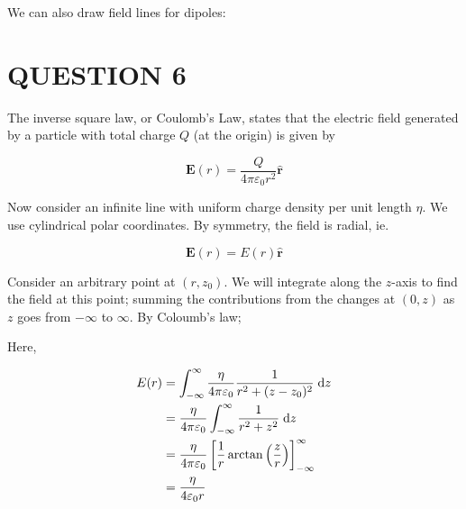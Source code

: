 \documentclass[a4paper]{article}
\begin{document}
We can also draw field lines for dipoles:
\begin{center}
\end{center}


\section{QUESTION 6}

The inverse square law, or Coulomb's Law, states that the electric field generated by a particle with total charge $ Q $ (at the origin) is given by

\[ \mathbf{E}(r) = \frac{Q}{4 \pi \varepsilon_{0} r^{2}} \hat{\mathbf{r}} \]

Now consider an infinite line with uniform charge density per unit length $ \eta $.
We use cylindrical polar coordinates. By symmetry, the field is radial, ie.

\[ \mathbf{E}(r) = E(r) \hat{\mathbf{r}} \]

Consider an arbitrary point at $ (r,z_{0}) $. We will integrate along the $ z $-axis to find the field at this point; summing the contributions from the changes at $ (0,z) $ as $ z $ goes from $ -\infty $ to $ \infty $. By Coloumb's law; 


%	

Here,

\begin{align*}
E(r) & = \int_{-\infty}^{\infty} \frac{\eta}{4 \pi \varepsilon_{0}} \frac{1}{r^{2} + (z-z_{0})^{2}} \; \mathrm{d} z \\
& = \frac{\eta}{4 \pi \varepsilon_{0}} \int_{-\infty}^{\infty}  \frac{1}{r^{2} + z^{2}} \; \mathrm{d} z \\
& = \frac{\eta}{4 \pi \varepsilon_{0}} \left[   \frac{1}{r} \arctan \left(  \frac{z}{r} \right)   \right]_{-\infty}^{\infty}  \\
& = \frac{\eta}{4 \varepsilon_{0} r} 
\end{align*}
\end{document}
